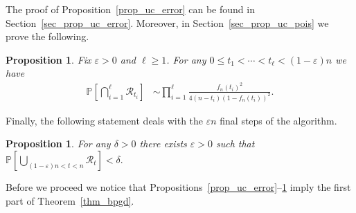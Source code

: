 \documentclass[10pt,reqno]{amsart}
\numberwithin{equation}{section}
\newcommand\cR{\mathcal R}
\newcommand\eps{\varepsilon}
\newcommand\brk[1]{\left\lbrack{#1}\right\rbrack}
\newcommand\pr{\mathbb{P}}
\newcommand\Prop{Proposition}
\newcommand\Thm{Theorem}
\newcommand\Sec{Section}
\newtheorem{proposition}[definition]{Proposition}
\def\pr{{\mathbb P}}
\begin{document}
The proof of \Prop~\ref{prop_uc_error} can be found in \Sec~\ref{sec_prop_uc_error}.
Moreover, in \Sec~\ref{sec_prop_uc_pois} we prove the following.

\begin{proposition}\label{prop_uc_pois}
	Fix $\eps>0$ and $\ell\geq1$.
	For any $0\leq t_1<\cdots<t_\ell<(1-\eps)n$ we have
	\begin{align}\label{eq_prop_uc_pois}
		\pr\brk{\bigcap_{i=1}^\ell\cR_{t_i}}&\sim\prod_{i=1}^\ell \frac{f_n(t_i)^2}{4(n-t_i)(1-f_n(t_i))^2}.
	\end{align}
\end{proposition}

Finally, the following statement deals with the $\eps n$ final steps of the algorithm.

\begin{proposition}\label{prop_uc_endgame}
	For any $\delta>0$ there exists $\eps>0$ such that $\pr\brk{\bigcup_{(1-\eps)n<t<n}\cR_{t}}<\delta.$ 
\end{proposition}


Before we proceed we notice that \Prop s~\ref{prop_uc_error}--\ref{prop_uc_endgame} imply the first part of \Thm~\ref{thm_bpgd}.
\end{document}
